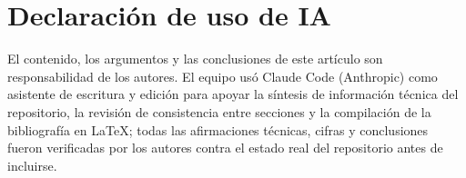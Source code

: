 \section*{Declaración de uso de IA}

El contenido, los argumentos y las conclusiones de este artículo son responsabilidad de los autores. El equipo usó Claude Code (Anthropic) como asistente de escritura y edición para apoyar la síntesis de información técnica del repositorio, la revisión de consistencia entre secciones y la compilación de la bibliografía en \LaTeX{}; todas las afirmaciones técnicas, cifras y conclusiones fueron verificadas por los autores contra el estado real del repositorio antes de incluirse.
